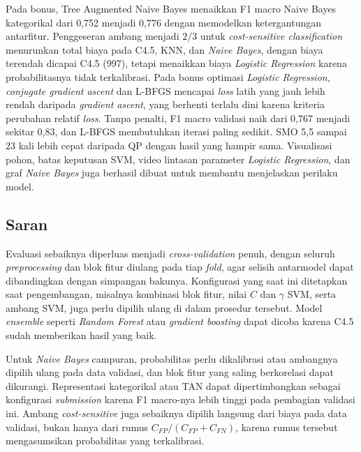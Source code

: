 Pada bonus, Tree Augmented Naive Bayes menaikkan F1 macro Naive Bayes
kategorikal dari 0,752 menjadi 0,776 dengan memodelkan ketergantungan
antarfitur. Penggeseran ambang menjadi $2/3$ untuk \textit{cost-sensitive
classification} menurunkan total biaya pada C4.5, KNN, dan \textit{Naive
Bayes}, dengan biaya terendah dicapai C4.5 (997), tetapi menaikkan biaya
\textit{Logistic Regression} karena probabilitasnya tidak terkalibrasi. Pada
bonus optimasi \textit{Logistic Regression}, \textit{conjugate gradient
ascent} dan L-BFGS mencapai \textit{loss} latih yang jauh lebih rendah
daripada \textit{gradient ascent}, yang berhenti terlalu dini karena kriteria
perubahan relatif \textit{loss}. Tanpa penalti, F1 macro validasi naik dari
0,767 menjadi sekitar 0,83, dan L-BFGS membutuhkan iterasi paling sedikit.
SMO 5,5 sampai 23 kali lebih cepat daripada QP dengan hasil yang hampir
sama. Visualisasi pohon, batas keputusan SVM, video lintasan parameter
\textit{Logistic Regression}, dan graf \textit{Naive Bayes} juga berhasil
dibuat untuk membantu menjelaskan perilaku model.

\subsection{Saran}

Evaluasi sebaiknya diperluas menjadi \textit{cross-validation} penuh, dengan
seluruh \textit{preprocessing} dan blok fitur diulang pada tiap \textit{fold},
agar selisih antarmodel dapat dibandingkan dengan simpangan bakunya.
Konfigurasi yang saat ini ditetapkan saat pengembangan, misalnya kombinasi
blok fitur, nilai $C$ dan $\gamma$ SVM, serta ambang SVM, juga perlu
dipilih ulang di dalam prosedur tersebut. Model \textit{ensemble} seperti
\textit{Random Forest} atau \textit{gradient boosting} dapat dicoba karena
C4.5 sudah memberikan hasil yang baik.

Untuk \textit{Naive Bayes} campuran, probabilitas perlu dikalibrasi atau
ambangnya dipilih ulang pada data validasi, dan blok fitur yang saling
berkorelasi dapat dikurangi. Representasi kategorikal atau TAN dapat
dipertimbangkan sebagai konfigurasi \textit{submission} karena F1 macro-nya
lebih tinggi pada pembagian validasi ini. Ambang \textit{cost-sensitive} juga
sebaiknya dipilih langsung dari biaya pada data validasi, bukan hanya dari
rumus $C_{FP}/(C_{FP}+C_{FN})$, karena rumus tersebut mengasumsikan
probabilitas yang terkalibrasi.

